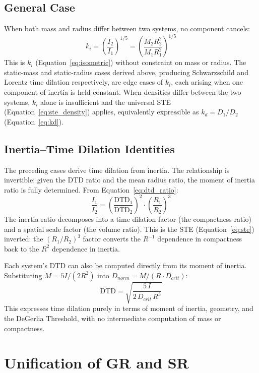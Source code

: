 \documentclass[twoside,twocolumn,9pt]{article}
\begin{document}
\subsection{General Case}
When both mass and radius differ between two systems, no component cancels:
\begin{equation}
k_i = \left(\frac{I_2}{I_1}\right)^{1/5} = \left(\frac{M_2 R_2^2}{M_1 R_1^2}\right)^{1/5}
\end{equation}
This is $k_i$ (Equation~\ref{eq:isometric}) without constraint on mass or radius. The static-mass and static-radius cases derived above, producing Schwarzschild and Lorentz time dilation respectively, are edge cases of $k_i$, each arising when one component of inertia is held constant. When densities differ between the two systems, $k_i$ alone is insufficient and the universal STE (Equation~\ref{eq:ste_density}) applies, equivalently expressible as $k_d = D_1/D_2$ (Equation~\ref{eq:kd}).

\subsection{Inertia--Time Dilation Identities}

The preceding cases derive time dilation from inertia. The relationship is invertible: given the DTD ratio and the mean radius ratio, the moment of inertia ratio is fully determined. From Equation~\ref{eq:dtd_ratio}:
\begin{equation} \label{eq:inertia_recovery}
\frac{I_1}{I_2} = \left(\frac{\text{DTD}_1}{\text{DTD}_2}\right)^2 \cdot \left(\frac{R_1}{R_2}\right)^3
\end{equation}
The inertia ratio decomposes into a time dilation factor (the compactness ratio) and a spatial scale factor (the volume ratio). This is the STE (Equation~\ref{eq:ste}) inverted: the $(R_1/R_2)^3$ factor converts the $R^{-1}$ dependence in compactness back to the $R^2$ dependence in inertia.

Each system's DTD can also be computed directly from its moment of inertia. Substituting $M = 5I/(2R^2)$ into $D_{norm} = M/(R \cdot D_{crit})$:
\begin{equation} \label{eq:dtd_from_I}
\text{DTD} = \sqrt{\frac{5\,I}{2\,D_{crit}\,R^3}}
\end{equation}
This expresses time dilation purely in terms of moment of inertia, geometry, and the DeGerlia Threshold, with no intermediate computation of mass or compactness.

\section{Unification of GR and SR}
\end{document}
